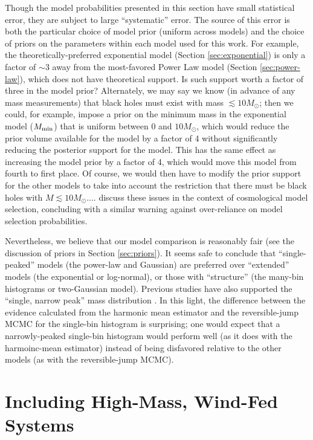 \documentclass[preprint]{aastex}
\newcommand{\Msun}{M_\odot}
\newcommand{\Mmin}{M_{\textnormal{min}}}
\begin{document}
Though the model probabilities presented in this section have small
statistical error, they are subject to large ``systematic'' error.
The source of this error is both the particular choice of model prior
(uniform across models) and the choice of priors on the parameters
within each model used for this work.  For example, the
theoretically-preferred exponential model (Section
\ref{sec:exponential}) is only a factor of $\sim 3$ away from the
most-favored Power Law model (Section \ref{sec:power-law}), which does
not have theoretical support.  Is such support worth a factor of three
in the model prior?  Alternately, we may say we know (in advance of
any mass measurements) that black holes must exist with mass $\lesssim
10\Msun$; then we could, for example, impose a prior on the minimum
mass in the exponential model ($\Mmin$) that is uniform between $0$
and $10 \Msun$, which would reduce the prior volume available for the
model by a factor of 4 without significantly reducing the posterior
support for the model.  This has the same effect as increasing the
model prior by a factor of 4, which would move this model from fourth
to first place.  Of course, we would then have to modify the prior
support for the other models to take into account the restriction that
there must be black holes with $M \lesssim 10\Msun$....
\citet{Linder2008} discuss these issues in the context of cosmological
model selection, concluding with a similar warning against
over-reliance on model selection probabilities.

Nevertheless, we believe that our model comparison is reasonably fair
(see the discussion of priors in Section \ref{sec:priors}).  It seems
safe to conclude that ``single-peaked'' models (the power-law and
Gaussian) are preferred over ``extended'' models (the exponential or
log-normal), or those with ``structure'' (the many-bin histograms or
two-Gaussian model).  Previous studies have also supported the
``single, narrow peak'' mass distribution \citep{Bailyn1998,Ozel2010}.
In this light, the difference between the evidence calculated from the
harmonic mean estimator and the reversible-jump MCMC for the
single-bin histogram is surprising; one would expect that a
narrowly-peaked single-bin histogram would perform well (as it does
with the harmoinc-mean estimator) instead of being disfavored relative
to the other models (as with the reversible-jump MCMC).

\section{Including High-Mass, Wind-Fed Systems}
\label{sec:higher-mass}
\end{document}
